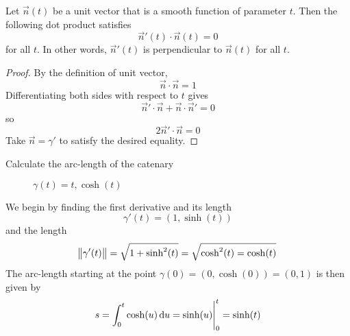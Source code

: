 \begin{proposition}
    Let \(\vec{n}(t)\) be a unit vector that is a smooth function of parameter \(t\). Then the following dot product satisfies
    \[
        \vec{n}'(t) \cdot \vec{n}(t) = 0
    \]
    for all \(t\). In other words, \(\vec{n}'(t)\) is perpendicular to \(\vec{n}(t)\) for all \(t\).
    \begin{proof}
        By the definition of unit vector,
        \[
            \vec{n} \cdot \vec{n} = 1
        \]
        Differentiating both sides with respect to \(t\) gives
        \[
            \vec{n}' \cdot \vec{n} + \vec{n} \cdot \vec{n}' = 0
        \]
        so
        \[
            2 \vec{n}' \cdot \vec{n} = 0
        \]
        Take \(\vec{n} = \gamma'\) to satisfy the desired equality.
    \end{proof}
\end{proposition}

\begin{problem}
Calculate the arc-length of the catenary
\begin{figure}[h]
    \centering
    \caption*{\(\gamma(t) = t, \cosh(t)\)}
\end{figure}
\end{problem}

\begin{solution}
    We begin by finding the first derivative and its length
    \[
        \gamma'(t) = (1, \sinh(t))
    \]
    and the length
    \[
        \norm{\gamma'(t)} = \sqrt{1 + \sinh^{2}(t)} = \sqrt{\cosh^{2}(t) = \cosh(t)}
    \]
    The arc-length starting at the point \(\gamma(0) = (0, \cosh(0)) = (0, 1)\) is then given by
    \[
        s = \int_{0}^{t} \cosh(u) \dif u = \eval{\sinh(u)}_{0}^{t} = \sinh(t)
    \]
\end{solution}

